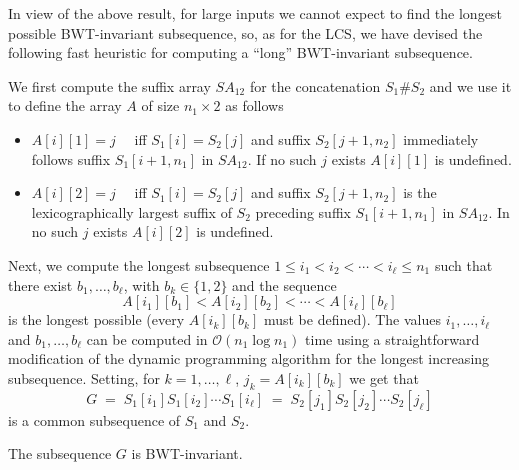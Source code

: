 \documentclass{llncs}
\newcommand{\Oh}[1]
  {\ensuremath{\mathcal{O}\!\left( {#1} \right)}}
\begin{document}
In view of the above result, for large inputs we cannot expect to find the
longest possible BWT-invariant subsequence, so, as for the LCS, we have
devised the following fast heuristic for computing a ``long'' BWT-invariant
subsequence.

We first compute the suffix array $SA_{12}$ for the concatenation $S_1\#S_2$
and we use it to define the array $A$ of size $n_1 \times 2$ as follows
\begin{itemize}
\item $A[i][1] = j\quad$ iff $S_1[i] = S_2[j]$ and suffix $S_2[j+1,n_2]$
    immediately follows suffix $S_1[i+1,n_1]$ in $SA_{12}$. If no such
    $j$ exists $A[i][1]$ is undefined.
\item $A[i][2] = j\quad$ iff $S_1[i] = S_2[j]$ and suffix $S_2[j+1,n_2]$
    is the lexicographically largest suffix of $S_2$ preceding suffix
    $S_1[i+1,n_1]$ in $SA_{12}$. In no such $j$ exists $A[i][2]$ is
    undefined.
\end{itemize}
Next, we compute the longest subsequence $1 \leq i_1 < i_2 < \cdots < i_\ell
\leq n_1$ such that there exist $b_1, \ldots, b_\ell$, with $b_k \in \{1,2\}$
and the sequence
$$
A[i_1][b_1] < A[i_2][b_2] < \cdots < A[i_\ell][b_\ell]
$$
is the longest possible (every $A[i_k][b_k]$ must be defined). The values
$i_1, \ldots, i_\ell$ and $b_1, \ldots, b_\ell$ can be computed in
$\Oh{n_1\log n_1}$ time using a straightforward modification of the dynamic
programming algorithm for the longest increasing subsequence. Setting, for
$k=1,\ldots,\ell$, $j_k = A[i_k][b_k]$ we get that
$$
G \;= \; S_1[i_1] S_1[i_2] \cdots S_1[i_\ell] \; = \; S_2[j_1] S_2[j_2] \cdots S_2[j_\ell]
$$
is a common subsequence of $S_1$ and $S_2$.

\begin{lemma}\label{lemma:bwtinv}
The subsequence $G$ is BWT-invariant.
\end{lemma}
\end{document}
